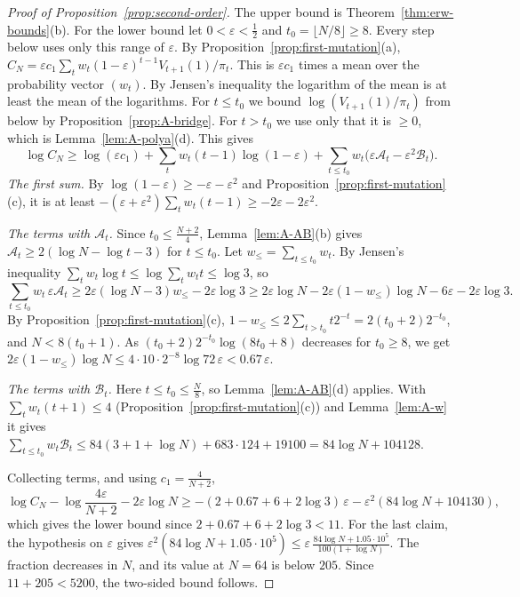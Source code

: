 \begin{proof}[Proof of Proposition~\ref{prop:second-order}]
The upper bound is Theorem~\ref{thm:erw-bounds}(b). For the lower bound let
$0<\varepsilon<\frac12$ and $t_0=\lfloor N/8\rfloor\ge8$. Every step below uses only this
range of $\varepsilon$. By Proposition~\ref{prop:first-mutation}(a),
$C_N=\varepsilon c_1\sum_tw_t(1-\varepsilon)^{t-1}V_{t+1}(1)/\pi_t$. This is
$\varepsilon c_1$ times a mean over the probability vector $(w_t)$. By
Jensen's inequality the logarithm of the mean is at least the mean of the
logarithms. For $t\le t_0$ we bound $\log(V_{t+1}(1)/\pi_t)$ from below by
Proposition~\ref{prop:A-bridge}. For $t>t_0$ we use only that it is $\ge0$,
which is Lemma~\ref{lem:A-polya}(d). This gives
\[
 \log C_N\ge\log(\varepsilon c_1)+\sum_tw_t(t-1)\log(1-\varepsilon)
 +\sum_{t\le t_0}w_t\bigl(\varepsilon \mathcal A_t-\varepsilon^2\mathcal B_t\bigr).
\]
\emph{The first sum.} By $\log(1-\varepsilon)\ge-\varepsilon-\varepsilon^2$
and Proposition~\ref{prop:first-mutation}(c), it is at least
$-(\varepsilon+\varepsilon^2)\sum_tw_t(t-1)\ge-2\varepsilon-2\varepsilon^2$.

\emph{The terms with $\mathcal A_t$.} Since $t_0\le\frac{N+2}4$,
Lemma~\ref{lem:A-AB}(b) gives $\mathcal A_t\ge2(\log N-\log t-3)$ for $t\le t_0$. Let
$w_\le=\sum_{t\le t_0}w_t$. By Jensen's inequality
$\sum_tw_t\log t\le\log\sum_tw_tt\le\log3$, so
\[
 \sum_{t\le t_0}w_t\,\varepsilon \mathcal A_t\ge2\varepsilon(\log N-3)w_\le-2\varepsilon\log3
 \ge2\varepsilon\log N-2\varepsilon(1-w_\le)\log N-6\varepsilon-2\varepsilon\log3 .
\]
By Proposition~\ref{prop:first-mutation}(c),
$1-w_\le\le2\sum_{t>t_0}t2^{-t}=2(t_0+2)2^{-t_0}$, and $N<8(t_0+1)$. As
$(t_0+2)2^{-t_0}\log(8t_0+8)$ decreases for $t_0\ge8$, we get
$2\varepsilon(1-w_\le)\log N\le4\cdot10\cdot2^{-8}\log72\,
\varepsilon<0.67\,\varepsilon$.

\emph{The terms with $\mathcal B_t$.} Here $t\le t_0\le\frac N8$, so Lemma~\ref{lem:A-AB}(d) applies. With
$\sum_tw_t(t+1)\le4$ (Proposition~\ref{prop:first-mutation}(c)) and
Lemma~\ref{lem:A-w} it gives
$\sum_{t\le t_0}w_t\mathcal B_t\le84(3+1+\log N)+683\cdot124+19100
=84\log N+104128$.

Collecting terms, and using $c_1=\frac4{N+2}$,
\[
 \log C_N-\log\frac{4\varepsilon}{N+2}-2\varepsilon\log N
 \ge-(2+0.67+6+2\log3)\,\varepsilon-\varepsilon^2(84\log N+104130),
\]
which gives the lower bound since $2+0.67+6+2\log3<11$. For the last claim,
the hypothesis on $\varepsilon$ gives
$\varepsilon^2(84\log N+1.05\cdot10^5)\le\varepsilon\,
\frac{84\log N+1.05\cdot10^5}{100(1+\log N)}$. The fraction decreases in
$N$, and its value at $N=64$ is below $205$. Since $11+205<5200$, the
two-sided bound follows.
\end{proof}

